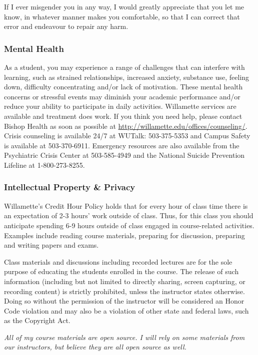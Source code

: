 If I ever misgender you in any way, I would greatly appreciate that you let me know, in whatever manner makes you comfortable, so that I can correct that error and endeavour to repair any harm. 

\subsubsection*{Mental Health}

As a student, you may experience a range of challenges that can interfere with learning, such as strained
relationships, increased anxiety, substance use, feeling down, difficulty concentrating and/or lack of
motivation. These mental health concerns or stressful events may diminish your academic performance and/or
reduce your ability to participate in daily activities. Willamette services are available and treatment does work.
If you think you need help, please contact Bishop Health as soon as possible at
\url{http://willamette.edu/offices/counseling/}. Crisis counseling is available 24/7 at WUTalk: 503-375-5353 and
Campus Safety is available at 503-370-6911. Emergency resources are also available from the Psychiatric
Crisis Center at 503-585-4949 and the National Suicide Prevention Lifeline at 1-800-273-8255.


\subsubsection*{Intellectual Property \& Privacy}

Willamette's Credit Hour Policy holds that for every hour of class time there is an expectation of 2-3 hours’ work outside of class.  Thus, for this class you should anticipate spending 6-9 hours outside of class engaged in course-related activities. Examples include reading course materials, preparing for discussion, preparing and writing papers and exams.

Class materials and discussions including recorded lectures are for the sole purpose of educating the students enrolled in the course.  The release of such information (including but not limited to directly sharing, screen capturing, or recording content) is strictly prohibited, unless the instructor states otherwise. Doing so without the permission of the instructor will be considered an Honor Code violation and may also be a violation of other state and federal laws, such as the Copyright Act.

\textit{All of my course materials are open source. I will rely on some materials from our instructors, but believe they are all open source as well.}